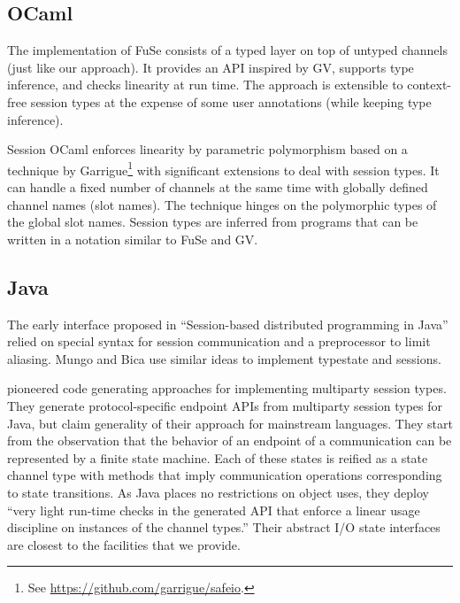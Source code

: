 \documentclass[acmsmall,screen]{acmart}
\begin{document}
\subsection{OCaml}
\label{sec:ocaml}

The implementation of FuSe \cite{DBLP:journals/jfp/Padovani17}
consists of a typed layer on top of untyped channels (just like our
approach).  It provides an API inspired by GV, supports
type inference, and checks linearity at run time. The approach is
extensible to context-free session types
\cite{DBLP:journals/toplas/Padovani19} at the expense of some user
annotations (while keeping type inference).

Session OCaml \cite{DBLP:journals/scp/ImaiYY19} enforces linearity by
parametric polymorphism based on a technique by
Garrigue\footnote{See \url{https://github.com/garrigue/safeio}.} with significant
extensions to deal with session types.
It can handle a fixed number of channels at the same time with
globally defined channel names (slot names). The technique hinges on
the polymorphic types of the global slot names.
Session types are inferred from programs that can be written in a notation
similar to FuSe and GV.


\subsection{Java}
\label{sec:java}

The early interface proposed in ``Session-based distributed programming in Java''
\cite{DBLP:conf/ecoop/HuYH08} relied on special syntax for session
communication and a preprocessor to limit aliasing.
Mungo \cite{DBLP:journals/scp/KouzapasDPG18} and Bica
\cite{DBLP:journals/corr/abs-1205-5344} use similar ideas to implement
typestate and sessions.

\citet{DBLP:conf/fase/HuY16} pioneered code generating
approaches for implementing multiparty session types. They generate protocol-specific
endpoint APIs from multiparty session  
types for Java, but claim generality of their approach for mainstream
languages. They start from the observation that the behavior of an
endpoint of a communication can be represented by a finite state
machine. Each of these states is reified as a state channel type with
methods that imply communication operations corresponding to state
transitions. As Java places no restrictions on object uses, they
deploy ``very light run-time checks in the 
generated API that enforce a linear usage discipline on instances of
the channel types.'' Their abstract I/O state interfaces are closest
to the facilities that we provide.
\end{document}
